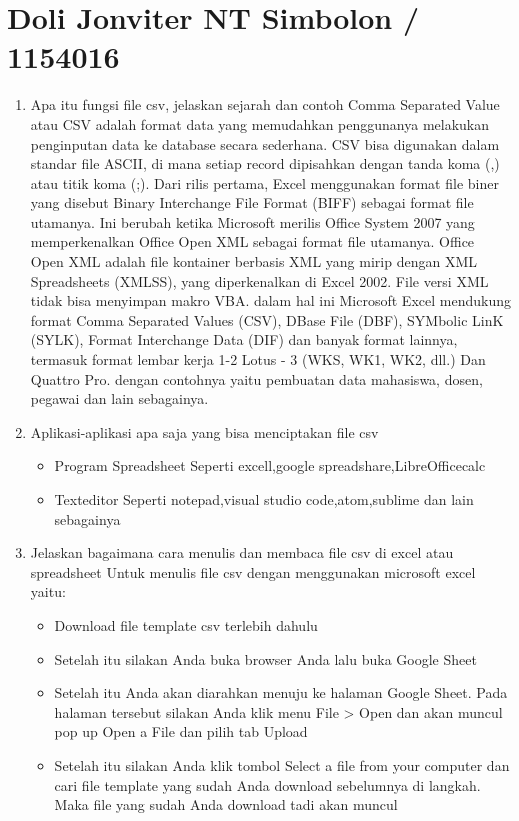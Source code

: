 \section{Doli Jonviter NT Simbolon / 1154016}
\begin{enumerate}
    \item Apa itu fungsi file csv, jelaskan sejarah dan contoh
   Comma Separated Value atau CSV adalah format data yang memudahkan penggunanya melakukan penginputan data ke database secara sederhana. CSV bisa digunakan dalam standar file ASCII, di mana setiap record dipisahkan dengan tanda koma (,) atau titik koma (;).
    Dari rilis pertama, Excel menggunakan format file biner yang disebut Binary Interchange File Format (BIFF) sebagai format file utamanya. Ini berubah ketika Microsoft merilis Office System 2007 yang memperkenalkan Office Open XML sebagai format file utamanya. Office Open XML adalah file kontainer berbasis XML yang mirip dengan XML Spreadsheets (XMLSS), yang diperkenalkan di Excel 2002. File versi XML tidak bisa menyimpan makro VBA.
   dalam hal ini  Microsoft Excel  mendukung format Comma Separated Values (CSV), DBase File (DBF), SYMbolic LinK (SYLK), Format Interchange Data (DIF) dan banyak format lainnya, termasuk format lembar kerja 1-2 Lotus - 3 (WKS, WK1, WK2, dll.) Dan Quattro Pro. dengan contohnya yaitu pembuatan data mahasiswa, dosen, pegawai dan lain sebagainya.
    \item Aplikasi-aplikasi apa saja yang bisa menciptakan file csv
    \begin{itemize}
       \item Program Spreadsheet
        Seperti excell,google spreadshare,LibreOfficecalc
        \item Texteditor
        Seperti notepad,visual studio code,atom,sublime dan lain sebagainya
    \end{itemize}
    \item Jelaskan bagaimana cara menulis dan membaca file csv di excel atau spreadsheet
    Untuk menulis file csv dengan menggunakan microsoft excel yaitu:
	\begin{itemize}
	\item Download file template csv terlebih dahulu
	\item Setelah itu silakan Anda buka browser Anda lalu buka Google Sheet
	\item Setelah itu Anda akan diarahkan menuju ke halaman Google Sheet. Pada halaman tersebut silakan Anda klik menu File > Open dan akan muncul pop up Open a File dan pilih tab Upload
	\item Setelah itu silakan Anda klik tombol Select a file from your computer dan cari file template yang sudah Anda download sebelumnya di langkah. Maka file yang sudah Anda download tadi akan muncul

\end{itemize}
\end{enumerate}
